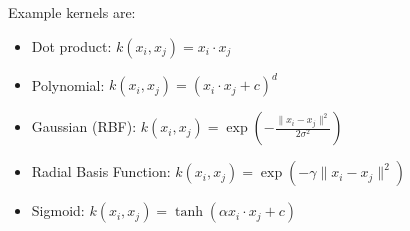 Example kernels are:
\begin{itemize}
  \item Dot product: $k(x_i, x_j) = x_i \cdot x_j$
  \item Polynomial: $k(x_i, x_j) = (x_i \cdot x_j + c)^d$
  \item Gaussian (RBF): $k(x_i, x_j) = \exp\left(-\frac{\|x_i -
    x_j\|^2}{2\sigma^2}\right)$
  \item Radial Basis Function: $k(x_i, x_j) = \exp\left(-\gamma \|x_i
    - x_j\|^2\right)$
  \item Sigmoid: $k(x_i, x_j) = \tanh(\alpha x_i \cdot x_j + c)$
\end{itemize}

